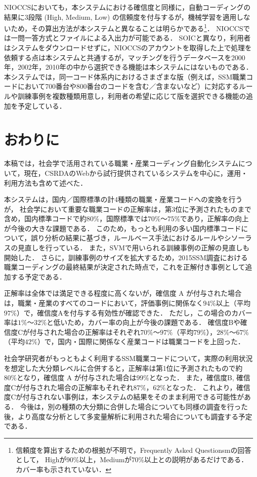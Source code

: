 \documentclass[japanese]{jnlp_1.4}
\begin{document}
NIOCCSにおいても，本システムにおける確信度と同様に，自動コーディングの結果に3段階 (High, Medium, Low) の信頼度を付与するが，機械学習を適用しないため，その算出方法が本システムと異なることは明らかである\footnote{信頼度を算出するための根拠が不明で，Frequently Asked Questionsmの回答として，
Highが$90\%$以上，Mediumが$70\%$以上との説明があるだけである．
カバー率も示されていない．}． 
NIOCCSでは一問一答方式とファイルによる入出力が可能である．
SOICと異なり，利用者はシステムをダウンロードせずに，NIOCCSのアカウントを取得した上で処理を依頼する点は本システムと共通するが，マッチングを行うデータベースを2000年，2002年，2010年の中から選択できる機能は本システムにはないものである．
本システムでは，同一コード体系内におけるさまざまな版（例えば，SSM職業コードにおいて700番台や800番台のコードを含む／含まないなど）に対応するルールや訓練事例を複数種類用意し，利用者の希望に応じて版を選択できる機能の追加を予定している．


\section{おわりに}

本稿では，社会学で活用されている職業・産業コーディング自動化システムについて，現在，CSRDAのWebから試行提供されているシステムを中心に，運用・利用方法も含めて述べた．

本システムは，国内／国際標準の計4種類の職業・産業コードへの変換を行うが，
社会学において重要な職業コードの正解率は，第3位に予測されたものまで含め，国内標準コードで約$80\%$，国際標準では$70\%$〜$75\%$であり，正解率の向上が今後の大きな課題である．
このため，もっとも利用の多い国内標準コードについて，誤り分析の結果に基づき，ルールベース手法におけるルールやシソーラスの見直しを行っている．
また，SVMで用いられる訓練事例の正解の見直しも開始した． 
さらに，訓練事例のサイズを拡大するため，2015SSM調査における職業コーディングの最終結果が決定された時点で，これを正解付き事例として追加する予定である．

正解率は全体では満足できる程度に高くないが，確信度 A が付与された場合は，職業・産業のすべてのコードにおいて，評価事例に関係なく$94\%$以上（平均$97\%$）で，確信度Aを付与する有効性が確認できた． 
ただし，この場合のカバー率は$1\%$〜$32\%$と低いため，カバー率の向上が今後の課題である．
確信度Bや確信度Cが付与された場合の正解率はそれぞれ$70\%$〜$97\%$（平均$79\%$），$28\%$〜$67\%$（平均$42\%$）で，国内・国際に関係なく産業コードは職業コードを上回った． 

社会学研究者がもっともよく利用するSSM職業コードについて，実際の利用状況を想定した大分類レベルに合併すると，正解率は第1位に予測されたもので約$80\%$となり，確信度 A が付与された場合は$99\%$となった．
また，確信度B, 確信度Cが付与された場合の正解率もそれぞれ$87\%$，$62\%$となった．
これより，確信度Cが付与されない事例は，本システムの結果をそのまま利用できる可能性がある． 
今後は，別の種類の大分類に合併した場合についても同様の調査を行った後，より高度な分析として多変量解析に利用された場合についても調査する予定である．
\end{document}
